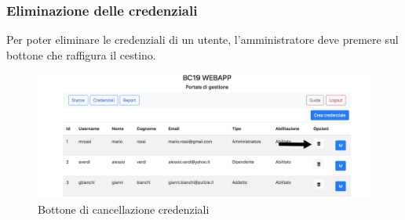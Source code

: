 \subsubsection{Eliminazione delle credenziali}
Per poter eliminare le credenziali di un utente, l'amministratore deve premere sul bottone che raffigura il cestino.
\begin{figure}[H]
	\centering
	\includegraphics[width=15cm]{res/images/optionDelete.jpg}
	\caption{Bottone di cancellazione credenziali}
\end{figure}

